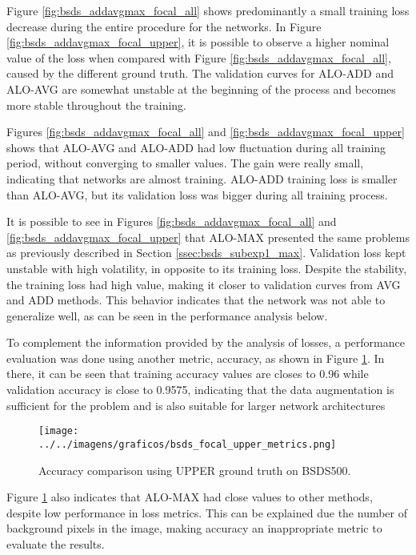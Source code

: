 Figure \ref{fig:bsds_addavgmax_focal_all} shows predominantly a small training loss decrease during the entire procedure for the networks.
In Figure \ref{fig:bsds_addavgmax_focal_upper}, it is possible to observe a higher nominal value of the loss when compared with Figure \ref{fig:bsds_addavgmax_focal_all}, caused by the different ground truth.
The validation curves for ALO-ADD and ALO-AVG are somewhat unstable at the beginning of the process and becomes more stable throughout the training.

Figures \ref{fig:bsds_addavgmax_focal_all} and \ref{fig:bsds_addavgmax_focal_upper} shows that ALO-AVG and ALO-ADD had low fluctuation during all training period, without converging to smaller values.
The gain were really small, indicating that networks are almost training.
ALO-ADD training loss is smaller than ALO-AVG, but its validation loss was bigger during all training process.

It is possible to see in Figures \ref{fig:bsds_addavgmax_focal_all} and \ref{fig:bsds_addavgmax_focal_upper} that ALO-MAX presented the same problems as previously described in Section \ref{ssec:bsds_subexp1_max}.
Validation loss kept unstable with high volatility, in opposite to its training loss.
Despite the stability, the training loss had high value, making it closer to validation curves from AVG and ADD methods.
This behavior indicates that the network was not able to generalize well, as can be seen in the performance analysis below.

To complement the information provided by the analysis of losses, a performance evaluation was done using another metric, accuracy, as shown in Figure \ref{fig:bsds_focal_upper_metrics}.
In there, it can be seen that training accuracy values are closes to 0.96 while validation accuracy is close to 0.9575, indicating that the data augmentation is sufficient for the problem and is also suitable for larger network architectures

\begin{figure}%
  \centering
  \caption{Accuracy comparison using UPPER ground truth on BSDS500.}
  \texttt{[image: ../../imagens/graficos/bsds\_focal\_upper\_metrics.png]}
  \sourceOwn
  \label{fig:bsds_focal_upper_metrics}
\end{figure}

Figure \ref{fig:bsds_focal_upper_metrics} also indicates that ALO-MAX had close values to other methods, despite low performance in loss metrics.
This can be explained due the number of background pixels in the image, making accuracy an inappropriate metric to evaluate the results.

